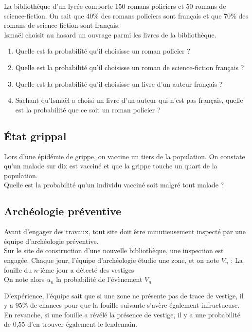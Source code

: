 \documentclass[oneside,12pt]{book}          %
\begin{document}
La bibliothèque d’un lycée comporte 150 romans policiers et 50 romans de science-fiction.
On sait que 40$\%$ des romans policiers sont français et que 70$\%$ des romans de science-fiction sont français. \\
Ismaël choisit au hasard un ouvrage parmi les livres de la bibliothèque.
\begin{enumerate}
    \item Quelle est la probabilité qu'il choisisse un roman policier ?
    \item Quelle est la probabilité qu'il choisisse un roman de science-fiction français ?
    \item Quelle est la probabilité qu'il choisisse un livre d'un auteur français ?
    \item Sachant qu'Ismaël a choisi un livre d'un auteur qui n'est pas français, quelle est la probabilité que ce soit un roman policier ?
\end{enumerate}



\subsection{État grippal}
 Lors d'une épidémie de grippe, on vaccine un tiers de la population. On constate qu'un malade sur dix est vacciné et que la grippe touche un quart de la population. \\
Quelle est la probabilité qu'un individu vacciné soit malgré tout malade ?



\subsection{Archéologie préventive}
Avant d'engager des travaux, tout site doit être minutieusement inspecté par une équipe d'archéologie préventive.\\
Sur le site de construction d'une nouvelle bibliothèque, une inspection est engagée. Chaque jour, l'équipe d'archéologie étudie une zone, et on note $V_n$ : \og La fouille du $n$-ième jour a détecté des vestiges\fg\\
On note alors $u_n$ la probabilité de l'évènement $V_n$

D'expérience, l'équipe sait que si une zone ne présente pas de trace de vestige, il  y a 95\% de chances pour que la fouille suivante s'avère également infructueuse. En revanche, si une fouille a révélé la présence de vestige, il y a une probabilité de 0,55 d'en trouver également le lendemain.
\end{document}
